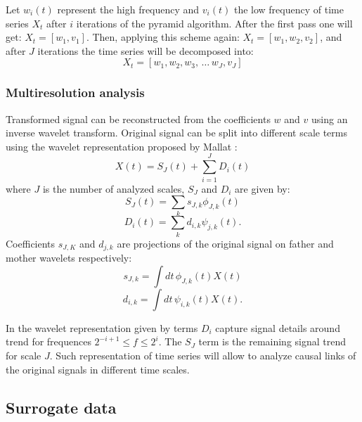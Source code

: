 Let $w_i(t)$ represent the high frequency and $v_i(t)$ the low frequency of time series $X_t$ after $i$ iterations of the pyramid algorithm.
After the first pass one will get: $X_t = [w_1, v_1]$.
Then, applying this scheme again: $X_t = [w_1, w_2, v_2]$, and after $J$ iterations the time series will be decomposed into:
\begin{equation}
	X_t = [w_1, w_2, w_3, \, \dots \, w_J, v_J]
\end{equation}



\subsubsection{Multiresolution analysis}
Transformed signal can be reconstructed from the coefficients $w$ and $v$ using an inverse wavelet transform.
Original signal can be split into different scale terms using the wavelet representation proposed by Mallat \cite{mallat1989}:
\begin{equation} \label{eq:decomposed}
	X(t) = S_J(t) + \sum_{i=1}^{J} D_i(t)
\end{equation}
where $J$ is the number of analyzed scales, $S_J$ and $D_i$ are given by:
\begin{equation}
	S_J(t) = \sum_k s_{J,k} \phi_{J,k}(t)
\end{equation}
\begin{equation}
	D_i(t) = \sum_k d_{i,k} \psi_{j,k}(t).
\end{equation}
Coefficients $s_{J,K}$ and $d_{j,k}$ are projections of the original signal on father and mother wavelets respectively:
\begin{equation}
	s_{J,k} = \int dt \, \phi_{J,k}(t) X(t)
\end{equation}
\begin{equation}
	d_{i,k} = \int dt \, \psi_{i,k}(t) X(t).
\end{equation}

In the wavelet representation given by  terms $D_i$ capture signal details around trend for frequences $2^{-i+1} \leq f \leq 2^{i}$.
The $S_J$ term is the remaining signal trend for scale $J$.
Such representation of time series will allow to analyze causal links of the original signals in different time scales.

\subsection{Surrogate data}

